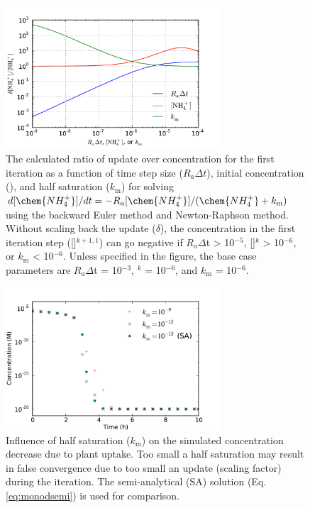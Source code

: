 \documentclass[gmd, manuscript]{copernicus}
\begin{document}
\begin{figure}[t]
\includegraphics[width=8cm]{../figs/fig07/fig07monodupdate1.pdf}
\caption{The calculated ratio of update over concentration for the first
iteration as a function of time step size ($R_a \Delta t$), initial
concentration (), and half saturation ($k_\text{m}$) for solving
$d[\chem{NH_4^+}]/dt=-R_a[\chem{NH_4^+}]/(\chem{NH_4^+} + k_\text{m})$ using
the backward Euler method and Newton-Raphson method. Without scaling back the
update ($\delta$), the concentration in the first iteration step
([]$^{k+1,1}$) can go negative if $R_a \Delta$t > 10$^{-5}$,
[]$^k$ > 10$^{-6}$, or $k_\text{m}$ < 10$^{-6}$. Unless specified in
the figure, the base case parameters are $R_a \Delta$t = 10$^{-3}$,
$^k$ = 10$^{-6}$, and $k_\text{m}$ = 10$^{-6}$.}
\label{fig:monodupdate}
\end{figure}

\begin{figure}[t]
\includegraphics[width=8cm]{../figs/fig08/fig08plantntake1.pdf}
\caption{Influence of half saturation ($k_\text{m}$) on the simulated
 concentration decrease due to plant uptake. Too small a half
saturation may result in false convergence due to too small an update (scaling
factor) during the iteration. The semi-analytical (SA) solution (Eq.
\ref{eq:monodsemi}) is used for comparison.}
\label{fig:plantntake}
\end{figure}
\end{document}
